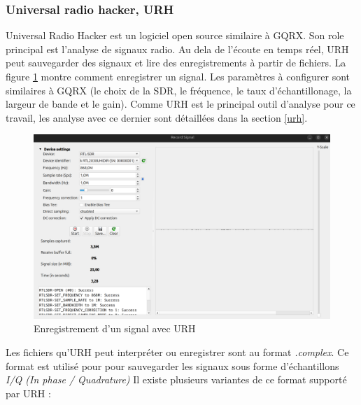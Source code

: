 \subsubsection{Universal radio hacker, URH}


Universal Radio Hacker est un logiciel open source similaire à GQRX. Son role principal est l'analyse de signaux radio. Au dela de l'écoute en temps réel, URH peut sauvegarder des signaux et lire des enregistrements à partir de fichiers. La figure \ref{term39} montre comment enregistrer un signal. Les paramètres à configurer sont similaires à GQRX (le choix de la SDR, le fréquence, le taux d'échantillonage, la largeur de bande et le gain). Comme URH est le principal outil d'analyse pour ce travail, les analyse avec ce dernier sont détaillées dans la section \ref{urh}.

\begin{figure}[h]
\centering

\includegraphics[scale=0.16]{images/urh1.png}
\caption{Enregistrement d'un signal avec URH}\label{term39}
\end{figure}

\newpage

Les fichiers qu'URH peut interpréter ou enregistrer sont au format \textit{.complex}. Ce format est utilisé pour pour sauvegarder les signaux sous forme d'échantillons \textit{I/Q (In phase / Quadrature)} Il existe plusieurs variantes de ce format supporté par URH :

\vspace{0.1cm}

